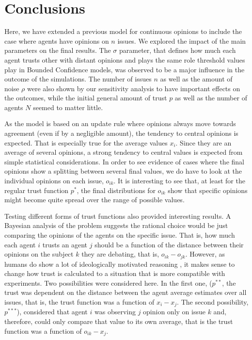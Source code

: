 \documentclass{article}
\begin{document}
    \section{Conclusions}

    Here, we have extended a previous model for continuous opinions
    \cite{martins08c} to include the case where agents have opinions on $n$ issues. We explored
    the impact of the main parameters on the final results. The \(\sigma\) parameter, that defines how much
    each agent trusts other with distant opinions and plays the same role threshold values play in Bounded Confidence models, was observed to be a major influence in the outcome of the simulations. The number of issues $n$ as well as the amount of noise $\rho$ were also shown by our sensitivity analysis to have important effects on the outcomes, while the initial general amount of trust $p$ as well as the number of agents $N$ seemed to matter little.
    
    As the model is based on an update rule where opinions always move towards agreement (even if by a negligible amount), the tendency to central opinions is expected. That is especially true for the average values $x_i$. Since they are an average of several opinions, a strong tendency to central values is expected from simple statistical considerations. In order to see evidence of cases where the final opinions show a splitting between several final values, we do have to look at the individual opinions on each issue, $o_{ik}$. It is interesting to see that, at least for the regular trust function $p^*$, the final distributions for  $o_{ik}$ show that specific opinions might become quite spread over the range of possible values. 
    
    Testing different forms of trust functions also provided interesting results. A Bayesian analysis of the problem suggests the rational choice would be just comparing the opinions of the agents on the specific issue. That is, how much each agent $i$ trusts an agent $j$ should be a function of the distance between their opinions on the subject $k$ they are debating, that is, $o_{ik}-o_{jk}$. However, as humans do show a lot of ideologically motivated reasoning  \cite{mercier11a,merciersperber11a,kahanetal11}, it makes sense to change how trust is calculated to a situation that is more compatible with experiments. Two possibilities were considered here.  In the first one,   (\(  p^{**}\), the  trust was dependent on the distance between the agent average estimates over all issues, that is, the trust function was a function of $x_{i}-x_{j}$. The second possibility, \( p^{***}\)), considered that agent $i$ was observing $j$ opinion only on issue $k$ and, therefore, could only compare that value to its own average, that is the trust function was a function of $o_{ik}-x_{j}$.
   
\end{document}
